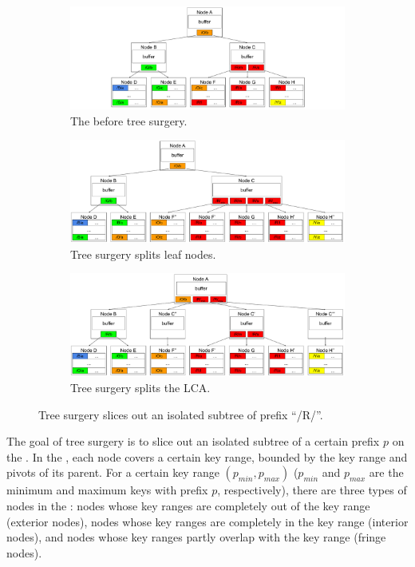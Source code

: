 \begin{figure}
    \begin{subfigure}{\textwidth}
        \centering
        \includegraphics[width=.9\linewidth]{fig/slice-1}
        \caption{\label{subfig:slice-1} The \bet before tree surgery.}
    \end{subfigure}
    \begin{subfigure}{\textwidth}
        \centering
        \includegraphics[width=.9\linewidth]{fig/slice-2}
        \caption{\label{subfig:slice-2} Tree surgery splits leaf nodes.}
    \end{subfigure}
    \begin{subfigure}{\textwidth}
        \centering
        \includegraphics[width=.9\linewidth]{fig/slice-3}
        \caption{\label{subfig:slice-3} Tree surgery splits the LCA.}
    \end{subfigure}
    \caption[Tree surgery example]{\label{fig:slice}
        Tree surgery slices out an isolated subtree of prefix ``/R/''.}
\end{figure}

The goal of tree surgery is to slice out an isolated subtree of a certain
prefix $p$ on the \bet.
In the \bet, each node covers a certain key range, bounded by the key range and
pivots of its parent.
For a certain key range $(p_{min}, p_{max})$ ($p_{min}$ and $p_{max}$ are the
minimum and maximum keys with prefix $p$, respectively), there are three types
of nodes in the \bet:
nodes whose key ranges are completely out of the key range (exterior nodes),
nodes whose key ranges are completely in the key range (interior nodes),
and nodes whose key ranges partly overlap with the key range (fringe nodes).


